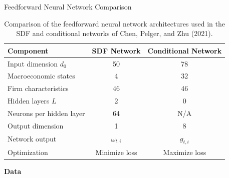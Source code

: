 \documentclass[xcolor={table}, aspectratio=169]{beamer}
\begin{document}
\begin{frame}{Feedforward Neural Network Comparison}

\small
\setlength{\tabcolsep}{6pt}
\renewcommand{\arraystretch}{1.20}

\begin{table}[htbp]
\centering

\begin{tabular}{lcc}
\hline
\textbf{Component} &
\textbf{SDF Network} &
\textbf{Conditional Network} \\
\hline

Input dimension $d_0$ & 50 & 78 \\

Macroeconomic states & 4 & 32 \\

Firm characteristics & 46 & 46 \\

Hidden layers $L$ & 2 & 0 \\

Neurons per hidden layer & 64 & N/A \\

Output dimension & 1 & 8 \\

Network output &
$\omega_{t,i}$ & $g_{t,i}$ \\

Optimization &
Minimize loss & Maximize loss \\

\hline
\end{tabular}

\vspace{0.2cm}

\caption{Comparison of the feedforward neural network
architectures used in the SDF and conditional networks
of Chen, Pelger, and Zhu (2021).}

\label{tab:ffn_comparison}

\end{table}

\end{frame}

\begin{frame}
	\centering
	\vfill
	{\Large \textbf{Data}}
	\vfill
\end{frame}
\end{document}
